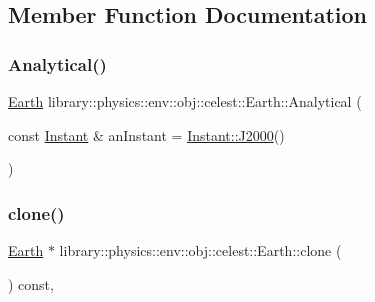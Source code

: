 \subsection{Member Function Documentation}
\mbox{\label{classlibrary_1_1physics_1_1env_1_1obj_1_1celest_1_1_earth_af0456d0dfe17d3cf4473ec02aec1683b}} 
\subsubsection{\texorpdfstring{Analytical()}{Analytical()}}
{\footnotesize\ttfamily \hyperlink{classlibrary_1_1physics_1_1env_1_1obj_1_1celest_1_1_earth}{Earth} library\+::physics\+::env\+::obj\+::celest\+::\+Earth\+::\+Analytical (\begin{DoxyParamCaption}\item[{const \hyperlink{classlibrary_1_1physics_1_1time_1_1_instant}{Instant} \&}]{an\+Instant = {\ttfamily \hyperlink{classlibrary_1_1physics_1_1time_1_1_instant_a2a4f57aa71693b8def06788d55bc3bd3}{Instant\+::\+J2000}()} }\end{DoxyParamCaption})\hspace{0.3cm}{\ttfamily [static]}}

\mbox{\label{classlibrary_1_1physics_1_1env_1_1obj_1_1celest_1_1_earth_aca39bec00a2046a3fcef9bf22be52428}} 
\subsubsection{\texorpdfstring{clone()}{clone()}}
{\footnotesize\ttfamily \hyperlink{classlibrary_1_1physics_1_1env_1_1obj_1_1celest_1_1_earth}{Earth} $\ast$ library\+::physics\+::env\+::obj\+::celest\+::\+Earth\+::clone (\begin{DoxyParamCaption}{ }\end{DoxyParamCaption}) const\hspace{0.3cm}{\ttfamily [override]}, {\ttfamily [virtual]}}



